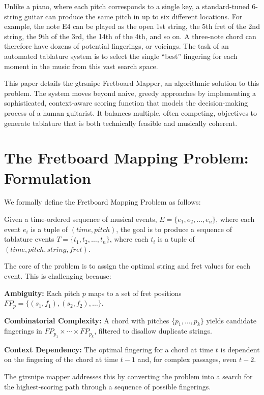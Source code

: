 \documentclass[conference]{IEEEtran}
\begin{document}
Unlike a piano, where each pitch corresponds to a single key, a standard-tuned 6-string guitar can produce the same pitch in up to six different locations. For example, the note E4 can be played as the open 1st string, the 5th fret of the 2nd string, the 9th of the 3rd, the 14th of the 4th, and so on. A three-note chord can therefore have dozens of potential fingerings, or voicings. The task of an automated tablature system is to select the single ``best'' fingering for each moment in the music from this vast search space.

This paper details the gtrsnipe Fretboard Mapper, an algorithmic solution to this problem. The system moves beyond naive, greedy approaches by implementing a sophisticated, context-aware scoring function that models the decision-making process of a human guitarist. It balances multiple, often competing, objectives to generate tablature that is both technically feasible and musically coherent.

\section{The Fretboard Mapping Problem: Formulation}

We formally define the Fretboard Mapping Problem as follows:

Given a time-ordered sequence of musical events, $E = \{e_1, e_2, \ldots, e_n\}$, where each event $e_i$ is a tuple of $(time, pitch)$, the goal is to produce a sequence of tablature events $T = \{t_1, t_2, \ldots, t_n\}$, where each $t_i$ is a tuple of $(time, pitch, string, fret)$.

The core of the problem is to assign the optimal string and fret values for each event. This is challenging because:

\textbf{Ambiguity:} Each pitch $p$ maps to a set of fret positions $FP_p = \{(s_1, f_1), (s_2, f_2), \ldots\}$.

\textbf{Combinatorial Complexity:} A chord with pitches $\{p_1, \ldots, p_k\}$ yields candidate fingerings in $FP_{p_1} \times \cdots \times FP_{p_k}$, filtered to disallow duplicate strings.

\textbf{Context Dependency:} The optimal fingering for a chord at time $t$ is dependent on the fingering of the chord at time $t-1$ and, for complex passages, even $t-2$.

The gtrsnipe mapper addresses this by converting the problem into a search for the highest-scoring path through a sequence of possible fingerings.
\end{document}
